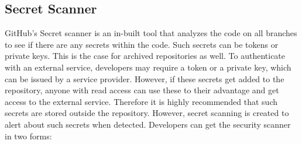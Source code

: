 \subsection{Secret Scanner}
GitHub's Secret scanner is an in-built tool that analyzes the code on all branches to see if there are any secrets within the code. Such secrets can be tokens or private keys. This is the case for archived repositories as well. To authenticate with an external service, developers may require a token or a private key, which can be issued by a service provider. However, if these secrets get added to the repository, anyone with read access can use these to their advantage and get access to the external service. Therefore it is highly recommended that such secrets are stored outside the repository. However, secret scanning is created to alert about such secrets when detected. Developers can get the
security scanner in two forms\cite{GithubSecretScanning}: 
